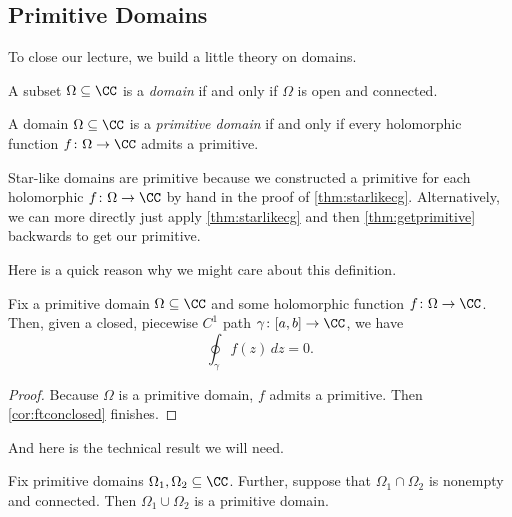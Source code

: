 \documentclass[../notes.tex]{subfiles}
\begin{document}
\subsection{Primitive Domains}
To close our lecture, we build a little theory on domains.
\begin{definition}[Domain]
	A subset $\Omega\subseteq\CC$ is a \textit{domain} if and only if $\Omega$ is open and connected.
\end{definition}
\begin{definition}
	A domain $\Omega\subseteq\CC$ is a \textit{primitive domain} if and only if every holomorphic function $f\colon \Omega\to\CC$ admits a primitive.
\end{definition}
\begin{example}
	Star-like domains are primitive because we constructed a primitive for each holomorphic $f\colon \Omega\to\CC$ by hand in the proof of \autoref{thm:starlikecg}. Alternatively, we can more directly just apply \autoref{thm:starlikecg} and then \autoref{thm:getprimitive} backwards to get our primitive.
\end{example}
Here is a quick reason why we might care about this definition.
\begin{lemma} \label{lem:primitivepaths}
	Fix a primitive domain $\Omega\subseteq\CC$ and some holomorphic function $f\colon \Omega\to\CC$. Then, given a closed, piecewise $C^1$ path $\gamma\colon [a,b]\to\CC$, we have
	\[\oint_\gamma f(z)\,dz=0.\]
\end{lemma}
\begin{proof}
	Because $\Omega$ is a primitive domain, $f$ admits a primitive. Then \autoref{cor:ftconclosed} finishes.
\end{proof}
And here is the technical result we will need.
\begin{lemma}
	Fix primitive domains $\Omega_1,\Omega_2\subseteq\CC$. Further, suppose that $\Omega_1\cap\Omega_2$ is nonempty and connected. Then $\Omega_1\cup\Omega_2$ is a primitive domain.
\end{lemma}
\end{document}

